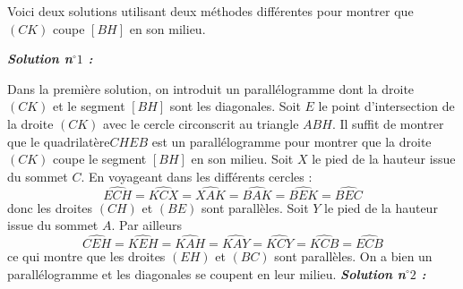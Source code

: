 \begin{sol}
Voici deux solutions utilisant deux méthodes différentes pour montrer que $(CK)$ coupe $[BH]$ en son milieu.

\textit{\textbf{Solution n$^\circ 1$ :}}

\begin{center}
\end{center}

Dans la première solution, on introduit un parallélogramme dont la droite $(CK)$ et le segment $[BH]$ sont les diagonales.
Soit $E$ le point d'intersection de la droite $(CK)$ avec le cercle circonscrit au triangle $ABH$. Il suffit de montrer que le quadrilatère$CHEB$ est un parallélogramme pour montrer que la droite $(CK)$ coupe le segment $[BH]$ en son milieu.
Soit $X$ le pied de la hauteur issue du sommet $C$. En voyageant dans les différents cercles :
$$\widehat{ECH}=\widehat{KCX}=\widehat{XAK}=\widehat{BAK}=\widehat{BEK}=\widehat{BEC}$$
donc les droites $(CH)$ et $(BE)$ sont parallèles.
Soit $Y$ le pied de la hauteur issue du sommet $A$.
Par ailleurs $$\widehat{CEH}=\widehat{KEH}=\widehat{KAH}=\widehat{KAY}=\widehat{KCY}=\widehat{KCB}=\widehat{ECB}$$
ce qui montre que les droites $(EH)$ et $(BC)$ sont parallèles.
On a bien un parallélogramme et les diagonales se coupent en leur milieu.
\newpage
\textit{\textbf{Solution n$^\circ 2$ :}}


\end{sol}
